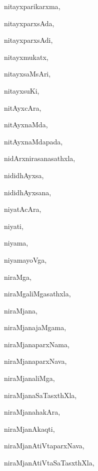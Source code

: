 \begin{multicols}{3}
{\noindent
{nitayxparikarxma}, \pageref{nitayxparikarxma}

\noindent
{nitayxparxsAda}, \pageref{nitayxparxsAda}

\noindent
{nitayxparxsAdi}, \pageref{nitayxparxsAdi}

\noindent
{nitayxmukatx}, \pageref{nitayxmukatx}

\noindent
{nitayxsaMsAri}, \pageref{nitayxsaMsAri}

\noindent
{nitayxsuKi}, \pageref{nitayxsuKi}

\noindent
{nitAyxcAra}, \pageref{nitAyxcAra}

\noindent
{nitAyxnaMda}, \pageref{nitAyxnaMda}

\noindent
{nitAyxnaMdapada}, \pageref{nitAyxnaMdapada}

\noindent
{nidArxnirasanasathxla}, \pageref{nidArxnirasanasathxla}

\noindent
{nididhAyxsa}, \pageref{nididhAyxsa}

\noindent
{nididhAyxsana}, \pageref{nididhAyxsana}

\noindent
{niyatAcAra}, \pageref{niyatAcAra}

\noindent
{niyati}, \pageref{niyati}

\noindent
{niyama}, \pageref{niyama}

\noindent
{niyamayoVga}, \pageref{niyamayoVga}

\noindent
{niraMga}, \pageref{niraMga}

\noindent
{niraMgaliMgasathxla}, \pageref{niraMgaliMgasathxla}

\noindent
{niraMjana}, \pageref{niraMjana}

\noindent
{niraMjanajaMgama}, \pageref{niraMjanajaMgama}

\noindent
{niraMjanaparxNama}, \pageref{niraMjanaparxNama}

\noindent
{niraMjanaparxNava}, \pageref{niraMjanaparxNava}

\noindent
{niraMjanaliMga}, \pageref{niraMjanaliMga}

\noindent
{niraMjanaSaTasxthXla}, \pageref{niraMjanaSaTasxthXla}

\noindent
{niraMjanahakAra}, \pageref{niraMjanahakAra}

\noindent
{niraMjanAkaqti}, \pageref{niraMjanAkaqti}

\noindent
{niraMjanAtiVtaparxNava}, \pageref{niraMjanAtiVtaparxNava}

\noindent
{niraMjanAtiVtaSaTasxthXla}, \pageref{niraMjanAtiVtaSaTasxthXla}

}
\end{multicols}
